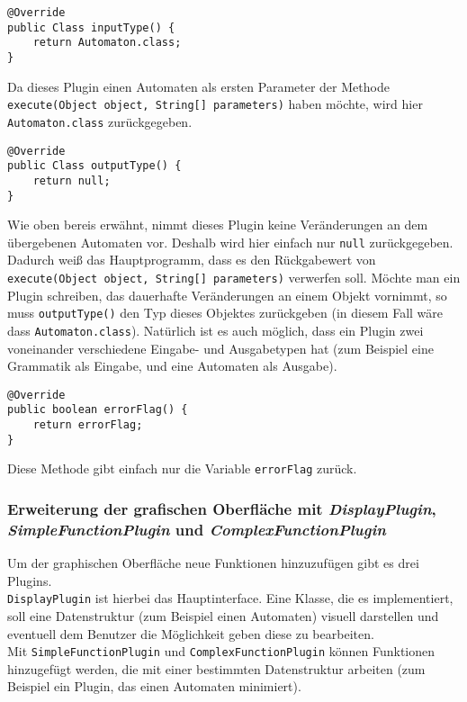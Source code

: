 \begin{lstlisting}[frame=single, basicstyle=\small, caption=Die Methode \textit{inputType}]
@Override
public Class inputType() {
	return Automaton.class;
}
\end{lstlisting}
Da dieses Plugin einen Automaten als ersten Parameter der Methode \lstinline[columns=fixed]{execute(Object object, String[] parameters)} haben möchte, wird hier \lstinline[columns=fixed]{Automaton.class} zurückgegeben.
\begin{lstlisting}[frame=single, basicstyle=\small, caption=Die Methode \textit{outputType}]
@Override
public Class outputType() {
	return null;
}
\end{lstlisting}
Wie oben bereis erwähnt, nimmt dieses Plugin keine Veränderungen an dem übergebenen Automaten vor. Deshalb wird hier einfach nur \lstinline[columns=fixed]{null} zurückgegeben. Dadurch weiß das Hauptprogramm, dass es den Rückgabewert von \lstinline[columns=fixed]{execute(Object object, String[] parameters)} verwerfen soll. Möchte man ein Plugin schreiben, das dauerhafte Veränderungen an einem Objekt vornimmt, so muss \lstinline[columns=fixed]{outputType()} den Typ dieses Objektes zurückgeben (in diesem Fall wäre dass \lstinline[columns=fixed]{Automaton.class}). Natürlich ist es auch möglich, dass ein Plugin zwei voneinander verschiedene Eingabe- und Ausgabetypen hat (zum Beispiel eine Grammatik als Eingabe, und eine Automaten als Ausgabe).
\begin{lstlisting}[frame=single, basicstyle=\small, caption=Die Methode \textit{errorFlag}]
@Override
public boolean errorFlag() {
	return errorFlag;
}
\end{lstlisting}
Diese Methode gibt einfach nur die Variable \lstinline[columns=fixed]{errorFlag} zurück.
\subsubsection{Erweiterung der grafischen Oberfläche mit \textit{DisplayPlugin}, \textit{SimpleFunctionPlugin} und \textit{ComplexFunctionPlugin}}
\label{sec:3.3.2}
Um der graphischen Oberfläche neue Funktionen hinzuzufügen gibt es drei Plugins.\\ \lstinline[columns=fixed]{DisplayPlugin} ist hierbei das Hauptinterface. Eine Klasse, die es implementiert, soll eine Datenstruktur (zum Beispiel einen Automaten) visuell darstellen und eventuell dem Benutzer die Möglichkeit geben diese zu bearbeiten.\\
Mit \lstinline[columns=fixed]{SimpleFunctionPlugin} und \lstinline[columns=fixed]{ComplexFunctionPlugin} können Funktionen hinzugefügt werden, die mit einer bestimmten Datenstruktur arbeiten (zum Beispiel ein Plugin, das einen Automaten minimiert).
